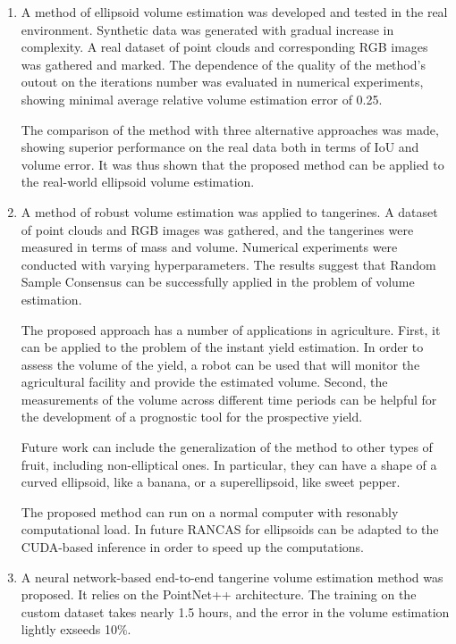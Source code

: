 \begin{enumerate}
\item A method of ellipsoid volume estimation was developed and tested in the real environment.
Synthetic data was generated with gradual increase in complexity.
A real dataset of point clouds and corresponding RGB images was gathered and marked.
The dependence of the quality of the method's outout on the iterations number was evaluated in numerical experiments, showing minimal average relative volume estimation error of 0.25.

The comparison of the method with three alternative approaches was made, showing superior performance on the real data both in terms of IoU and volume error.
It was thus shown that the proposed method can be applied to the real-world ellipsoid volume estimation.

\item A method of robust volume estimation was applied to tangerines.
A dataset of point clouds and RGB images was gathered, and the tangerines were measured in terms of mass and volume.
Numerical experiments were conducted with varying hyperparameters.
The results suggest that Random Sample Consensus can be successfully applied in the problem of volume estimation.

The proposed approach has a number of applications in agriculture.
First, it can be applied to the problem of the instant yield estimation.
In order to assess the volume of the yield, a robot can be used that will monitor the agricultural facility and provide the estimated volume.
Second, the measurements of the volume across different time periods can be helpful for the development of a prognostic tool for the prospective yield.

Future work can include the generalization of the method to other types of fruit, including non-elliptical ones.
In particular, they can have a shape of a curved ellipsoid, like a banana, or a superellipsoid, like sweet pepper.

The proposed method can run on a normal computer with resonably computational load.
In future RANCAS for ellipsoids can be adapted to the CUDA-based inference in order to speed up the computations.

\item A neural network-based end-to-end tangerine volume estimation method was proposed.
It relies on the PointNet++ architecture.
The training on the custom dataset takes nearly 1.5 hours, and the error in the volume estimation lightly exseeds 10$\%$.


\end{enumerate}
